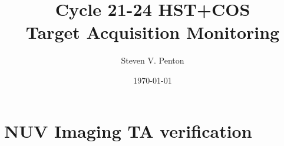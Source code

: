 \documentclass{stsci_report}
\title{\textbf{Cycle 21-24 HST+COS\\Target Acquisition Monitoring}}
\author{Steven V. Penton}
\date{\today}
\newcommand{\tacq}[1]{\texttt{ACQ/#1}}
\begin{document}
\maketitle


\clearpage
\tableofcontents
\listoffigures
\listoftables
\newpage


\clearpage



\clearpage





\clearpage



\clearpage
\section{NUV Imaging TA verification}\label{sec:NimVER}




\end{document}
